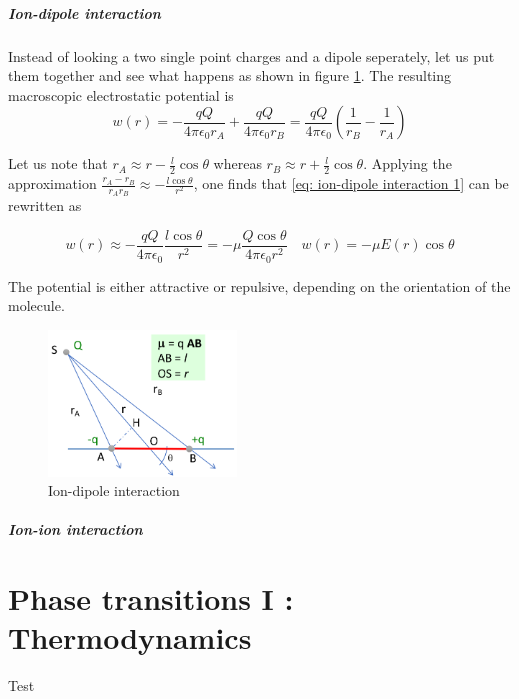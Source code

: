 \documentclass[../phys-f308.tex]{subfiles}
\begin{document}
    \subsubsection{Ion-dipole interaction}

    Instead of looking a two single point charges and a dipole seperately, let us put them together and see what happens as shown in figure \ref{fig: ion-dipole interaction}. The resulting macroscopic electrostatic potential is
    \begin{equation}
        w(r) = -\frac{qQ}{4\pi\epsilon_0r_A}+\frac{qQ}{4\pi\epsilon_0r_B} = \frac{qQ}{4\pi\epsilon_0}\left(\frac{1}{r_B}-\frac{1}{r_A}\right)\label{eq: ion-dipole interaction 1}
    \end{equation}

    Let us note that $r_A \approx r-\frac{l}{2}\cos\theta$ whereas $r_B\approx r+\frac{l}{2}\cos\theta$. Applying the approximation $\frac{r_A-r_B}{r_Ar_B}\approx -\frac{l\cos\theta}{r^2}$, one finds that  \eqref{eq: ion-dipole interaction 1} can be rewritten as
    
    \begin{equation}
        w(r) \approx -\frac{qQ}{4\pi\epsilon_0}\frac{l\cos\theta}{r^2} = -\mu\frac{Q\cos\theta}{4\pi\epsilon_0r^2} \quad w(r) = -\mu E(r)\cos\theta
    \end{equation}

    The potential is either attractive or repulsive, depending on the orientation of the molecule.

    \begin{figure}[h!]
        \centering
        \includegraphics[width=50mm]{partA/Pictures/DipoleIon.png}
        \caption{Ion-dipole interaction}
        \label{fig: ion-dipole interaction}
    \end{figure}

    \subsubsection{Ion-ion interaction}

    \part{Phase transitions I : Thermodynamics}

    Test
\end{document}
